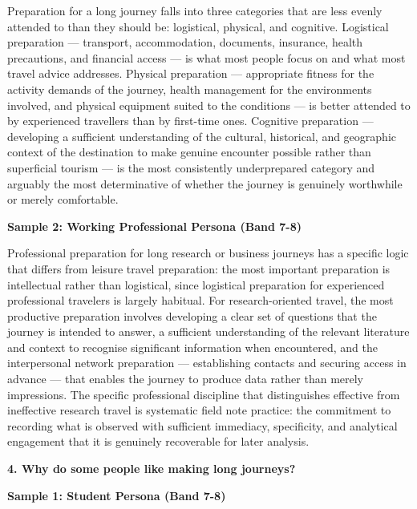Preparation for a long journey falls into three categories that are less evenly attended to than they should be: logistical, physical, and cognitive. Logistical preparation — transport, accommodation, documents, insurance, health precautions, and financial access — is what most people focus on and what most travel advice addresses. Physical preparation — appropriate fitness for the activity demands of the journey, health management for the environments involved, and physical equipment suited to the conditions — is better attended to by experienced travellers than by first-time ones. Cognitive preparation — developing a sufficient understanding of the cultural, historical, and geographic context of the destination to make genuine encounter possible rather than superficial tourism — is the most consistently underprepared category and arguably the most determinative of whether the journey is genuinely worthwhile or merely comfortable.

\textbf{Sample 2: Working Professional Persona (Band 7-8)}

Professional preparation for long research or business journeys has a specific logic that differs from leisure travel preparation: the most important preparation is intellectual rather than logistical, since logistical preparation for experienced professional travelers is largely habitual. For research-oriented travel, the most productive preparation involves developing a clear set of questions that the journey is intended to answer, a sufficient understanding of the relevant literature and context to recognise significant information when encountered, and the interpersonal network preparation — establishing contacts and securing access in advance — that enables the journey to produce data rather than merely impressions. The specific professional discipline that distinguishes effective from ineffective research travel is systematic field note practice: the commitment to recording what is observed with sufficient immediacy, specificity, and analytical engagement that it is genuinely recoverable for later analysis.

\separator

\begin{ieltsquestion}
\textbf{4. Why do some people like making long journeys?}
\end{ieltsquestion}
\textbf{Sample 1: Student Persona (Band 7-8)}

